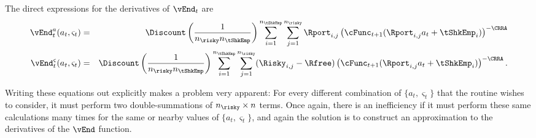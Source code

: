 \documentclass[titlepage]{\econtex}
\begin{document}
The direct expressions for the derivatives of $\vEnd_{t}$ are
\begin{eqnarray}
        \vEnd_{t}^{{a}}({a}_{t},\varsigma_{t}) & = & \Discount \left(\frac{1}{n_{\risky} n_{\tShkEmp}}\right)\sum_{i=1}^{n_{\tShkEmp}}\sum_{j=1}^{n_{\risky} }\Rport_{i,j} \left(\cFunc_{t+1}(\Rport_{i,j}{a}_{t}+\tShkEmp_{i})\right)^{-\CRRA}
\\      \vEnd_{t}^{\varsigma}({a}_{t},\varsigma_{t}) & = & \Discount \left(\frac{1}{n_{\risky} n_{\tShkEmp}}\right)\sum_{i=1}^{n_{\tShkEmp}}\sum_{j=1}^{n_{\risky} }(\Risky_{i,j}-\Rfree)\left(\cFunc_{t+1}(\Rport_{i,j}{a}_{t}+\tShkEmp_{i})\right)^{-\CRRA}.
\end{eqnarray}

Writing these equations out explicitly makes a problem very
apparent: For every different combination of $\{{a}_{t},\varsigma_{t}\}$
that the routine wishes to consider, it must perform two
double-summations of $n_{\risky} \times n$ terms.  Once again, there is an
inefficiency if it must perform these same calculations many times
for the same or nearby values of $\{{a}_{t},\varsigma_{t}\}$, and again
the solution is to construct an approximation to the derivatives of
the $\vEnd$ function.
\end{document}
